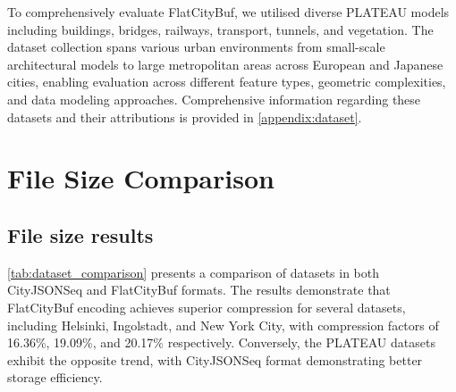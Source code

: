 To comprehensively evaluate FlatCityBuf, we utilised diverse PLATEAU models including buildings, bridges, railways, transport, tunnels, and vegetation. The dataset collection spans various urban environments from small-scale architectural models to large metropolitan areas across European and Japanese cities, enabling evaluation across different feature types, geometric complexities, and data modeling approaches. Comprehensive information regarding these datasets and their attributions is provided in \autoref{appendix:dataset}.

\section{File Size Comparison}
\label{result:file_size_comparison}

\subsection{File size results}
\label{result:overview:filesize_comparison}

\autoref{tab:dataset_comparison} presents a comparison of datasets in both CityJSONSeq and FlatCityBuf formats. The results demonstrate that FlatCityBuf encoding achieves superior compression for several datasets, including Helsinki, Ingolstadt, and New York City, with compression factors of 16.36\%, 19.09\%, and 20.17\% respectively. Conversely, the PLATEAU datasets exhibit the opposite trend, with CityJSONSeq format demonstrating better storage efficiency.

